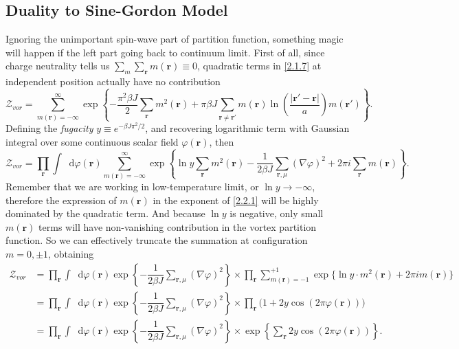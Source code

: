 \documentclass[10pt,nofootinbib]{revtex4}
\newcommand*\dd{\mathop{}\!\mathrm{d}}
\newcounter{Def}[section]
\def\Z{\mathcal{Z}}
\begin{document}
		

	\subsection{Duality to Sine-Gordon Model}
		Ignoring the unimportant spin-wave part of partition function, something magic will happen if the left part going back to continuum limit. First of all, since charge neutrality tells us $\sum_{m}\sum_{\bm{r}}m(\bm{r})\equiv0$, quadratic terms in \eqref{2.1.7} at independent position actually have no contribution
		\begin{equation*}
			\Z_{vor}=\sum_{m(\bm{r})=-\infty}^\infty\exp \left\{-\dfrac{\pi^2\beta J}{2}\sum_{\bm{r}}m^2(\bm{r})+\pi\beta J\sum_{\bm{r}\neq\bm{r'}}m(\bm{r})\ln\left(\dfrac{|\bm{r'}-\bm{r}|}{a}\right)m(\bm{r'})\right\}.
		\end{equation*}
		Defining the \emph{fugacity} $y\equiv e^{-\beta J\pi^2/2}$, and recovering logarithmic term with Gaussian integral over some continuous scalar field $\varphi(\bm{r})$, then
		\begin{equation}\label{2.2.1}
			\Z_{vor}=\prod_{\bm{r}}\int\dd\varphi(\bm{r})\sum_{m(\bm{r})=-\infty}^\infty\exp \left\{\ln y\sum_{\bm{r}}m^2(\bm{r})-\dfrac{1}{2\beta J}\sum_{\bm{r},\mu}(\nabla\varphi)^2+2\pi i\sum_{\bm{r}}m(\bm{r})\right\}.
		\end{equation}
		Remember that we are working in low-temperature limit, or $\ln y \rightarrow -\infty$, therefore the expression of $m(\bm{r})$ in the exponent of \eqref{2.2.1} will be highly dominated by the quadratic term. And because $\ln y$ is negative, only small $m(\bm{r})$ terms will have non-vanishing contribution in the vortex partition function. So we can effectively truncate the summation at configuration $m=0,\pm1$, obtaining
		\begin{align}
		 	\Z_{vor}&=\prod_{\bm{r}}\int\dd\varphi(\bm{r})\exp \left\{-\dfrac{1}{2\beta J}\sum_{\bm{r},\mu}(\nabla\varphi)^2\right\}\times\prod_{\bm{r}}\sum_{m(\bm{r})=-1}^{+1}\exp \bigg\{\ln y\cdot m^2(\bm{r})+2\pi im(\bm{r})\bigg\}\nonumber\\
		 	&=\prod_{\bm{r}}\int\dd\varphi(\bm{r})\exp \left\{-\dfrac{1}{2\beta J}\sum_{\bm{r},\mu}(\nabla\varphi)^2\right\}\times \prod_{\bm{r}}\bigg(1+2y\cos(2\pi\varphi(\bm{r}))\bigg)\nonumber\\
		 	&=\prod_{\bm{r}}\int\dd\varphi(\bm{r})\exp \left\{-\dfrac{1}{2\beta J}\sum_{\bm{r},\mu}(\nabla\varphi)^2\right\}\times \exp\left\{\sum_{\bm{r}}2y\cos(2\pi\varphi(\bm{r}))\right\}.\label{2.2.2}
		 \end{align}
\end{document}
